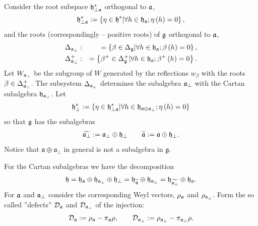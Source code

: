 \documentclass[12pt]{article}
\theoremstyle{definition}
\begin{document}
Consider the root subspace $\frak{h}_{\perp \frak{a}}^{\ast }$ orthogonal to
$\frak{a}$,
\begin{equation*}
\frak{h}_{\perp \frak{a}}^{\ast }:=\left\{ \eta \in \frak{h}^{\ast }|\forall
h\in \frak{h}_{\frak{a}};\eta \left( h\right) =0\right\} ,
\end{equation*}
and the roots (correspondingly -- positive roots) of $\frak{g}$ orthogonal
to $\frak{a}$,
\begin{eqnarray}
\Delta _{\frak{a}_{\perp }} &:&=\left\{ \beta \in \Delta _{\frak{g}}|\forall
h\in \frak{h}_{\frak{a}};\beta \left( h\right) =0\right\} ,
\label{delta a ort} \\
\Delta _{\frak{a}_{\perp }}^{+} &:&=\left\{ \beta ^{+}\in \Delta _{\frak{g}%
}^{+}|\forall h\in \frak{h}_{\frak{a}};\beta ^{+}\left( h\right) =0\right\} .
\notag
\end{eqnarray}
Let $W_{\frak{a}_{\perp }}$ be the subgroup of $W$ generated by the
reflections $w_{\beta }$ with the roots $\beta \in \Delta _{\frak{a}_{\perp
}}^{+}$. The subsystem $\Delta _{\frak{a}_{\perp }}$ determines the
subalgebra $\frak{a}_{\perp }$ with the Cartan subalgebra $\frak{h}_{\frak{a}%
_{\perp }}$. Let
\begin{equation*}
\frak{h}_{\perp }^{\ast }:=\left\{ \eta \in \frak{h}_{\perp \frak{a}}^{\ast
}|\forall h\in \frak{h}_{\frak{a}\oplus \frak{a}_{\perp }};\eta \left(
h\right) =0\right\}
\end{equation*}
so that $\frak{g}$ has the subalgebras
\begin{eqnarray}
\widetilde{\frak{a}_{\perp }} :=\frak{a}_{\perp }\oplus \frak{h}_{\perp }
\qquad
\widetilde{\frak{a}} :=\frak{a}\oplus \frak{h}_{\perp }.
\end{eqnarray}
Notice that $\mathfrak{a} \oplus \mathfrak{a}_{\bot}$ in general is not a
subalgebra in $\mathfrak{g}$.

For the Cartan subalgebras we have the decomposition
\begin{equation}
\frak{h}=\frak{\frak{h}_{\frak{a}}}\oplus \frak{h}_{\frak{a}_{\perp }}\oplus
\frak{h}_{\perp }=\frak{\frak{h}_{\widetilde{\frak{a}}}}\oplus \frak{h}_{%
\frak{a}_{\perp }}=\frak{\frak{h}_{\widetilde{\frak{a}_{\perp }}}}\oplus
\frak{h}_{\frak{a}}.
\end{equation}
For $\frak{a}$ and $\frak{a}_{\perp }$ consider the
corresponding Weyl vectors, $\rho _{\frak{a}}$ and $\rho _{\frak{a}_{\perp
}} $. Form the so called ''defects'' $\mathcal{D}_{\frak{a}}$ and $\mathcal{%
D}_{\frak{a}_{\perp }}$ of the injection:
\begin{equation}
\mathcal{D}_{\frak{a}}:=\rho _{\frak{a}}-\pi _{\frak{a}}\rho , \qquad
\mathcal{D}_{\frak{a}_{\perp }}:=\rho _{\frak{a}_{\perp }}-\pi _{\frak{a}%
_{\perp }}\rho .  \label{defect ort}
\end{equation}
\end{document}
